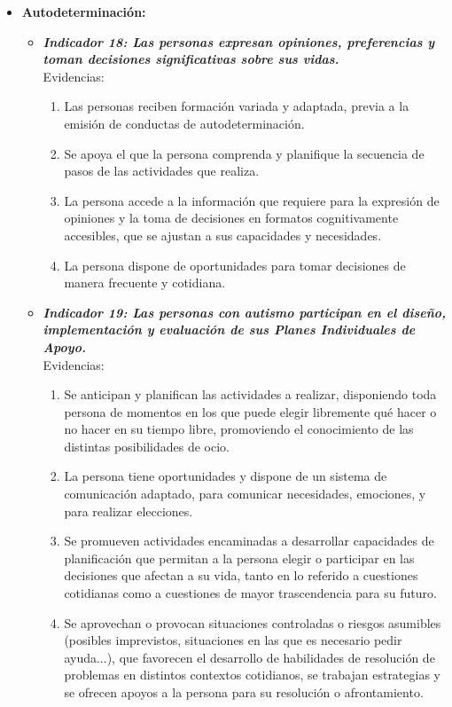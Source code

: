 \begin{itemize}
\begin{itemize}
\begin{itemize}
\begin{itemize}
\begin{enumerate}
				\end{enumerate}
			\end{itemize}
			\item \textbf{Autodeterminación:}
			\begin{itemize}
				\item \textbf{\textit{Indicador 18: Las personas expresan opiniones, preferencias y toman decisiones significativas sobre sus vidas.}}\\Evidencias:
				
				\begin{enumerate}
					\item Las personas reciben formación variada y adaptada, previa a la emisión de conductas de autodeterminación. 
					\item Se apoya el que la persona comprenda y planifique la secuencia de pasos de las actividades que realiza.  
					\item La persona accede a la información que requiere para la expresión de opiniones y la toma de decisiones en formatos cognitivamente accesibles, que se ajustan a sus capacidades y necesidades. 
					\item La persona dispone de oportunidades para tomar decisiones de manera frecuente y cotidiana. 
				\end{enumerate}
				\item \textbf{\textit{Indicador 19: Las personas con autismo participan en el diseño, implementación y evaluación de sus Planes Individuales de Apoyo.}}\\Evidencias:
				
				\begin{enumerate}
					\item Se anticipan y planifican las actividades a realizar, disponiendo toda persona de momentos en los que puede elegir libremente qué hacer o no hacer en su tiempo libre, promoviendo el conocimiento de las distintas posibilidades de ocio. 
					\item La persona tiene oportunidades y dispone de un sistema de comunicación adaptado, para comunicar necesidades, emociones, y para realizar elecciones. 
					\item Se promueven actividades encaminadas a desarrollar capacidades de planificación que permitan a la persona elegir o participar en las decisiones que afectan a su vida, tanto en lo referido a cuestiones cotidianas como a cuestiones de mayor trascendencia para su futuro. 
					\item Se aprovechan o provocan situaciones controladas o riesgos asumibles (posibles imprevistos, situaciones en las que es necesario pedir ayuda...), que favorecen el desarrollo de habilidades de resolución de problemas en distintos contextos cotidianos, se trabajan estrategias y se ofrecen apoyos a la persona para su resolución o afrontamiento. 
					 

\end{enumerate}
\end{itemize}
\end{itemize}
\end{itemize}
\end{itemize}
